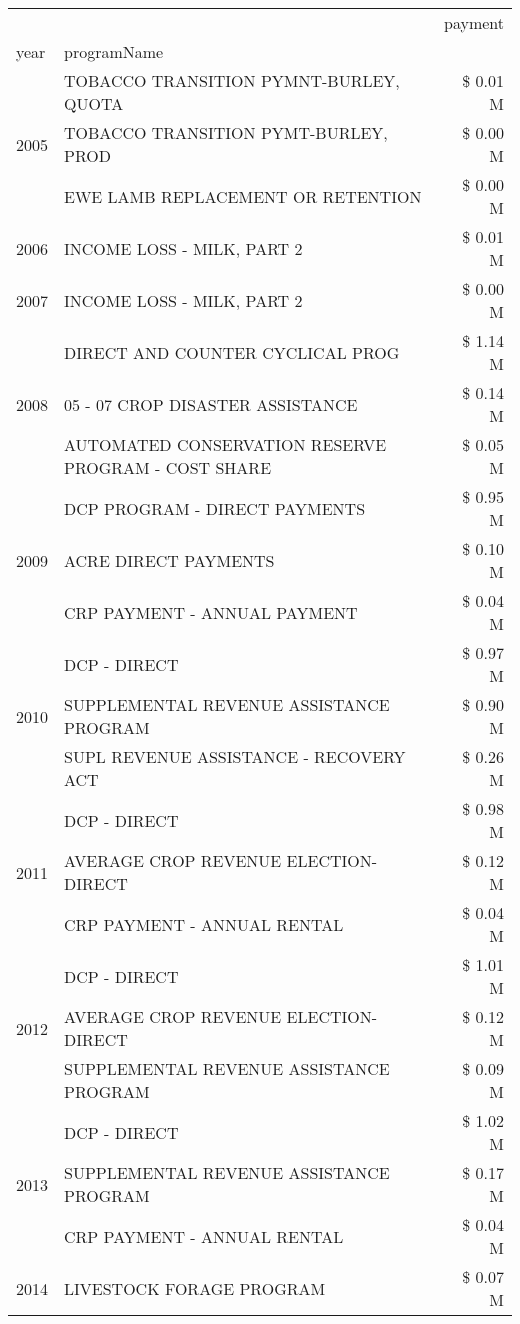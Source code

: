 \begin{tabular}{llr}
\toprule
 &  & payment \\
year & programName &  \\
\midrule
\multirow[t]{3}{*}{2005} & TOBACCO TRANSITION PYMNT-BURLEY, QUOTA & \$ 0.01 M \\
 & TOBACCO TRANSITION PYMT-BURLEY, PROD & \$ 0.00 M \\
 & EWE LAMB REPLACEMENT OR RETENTION & \$ 0.00 M \\
\cline{1-3}
2006 & INCOME LOSS - MILK, PART 2 & \$ 0.01 M \\
\cline{1-3}
2007 & INCOME LOSS - MILK, PART 2 & \$ 0.00 M \\
\cline{1-3}
\multirow[t]{3}{*}{2008} & DIRECT AND COUNTER CYCLICAL PROG & \$ 1.14 M \\
 & 05 - 07 CROP DISASTER ASSISTANCE & \$ 0.14 M \\
 & AUTOMATED CONSERVATION RESERVE PROGRAM - COST SHARE & \$ 0.05 M \\
\cline{1-3}
\multirow[t]{3}{*}{2009} & DCP PROGRAM - DIRECT PAYMENTS & \$ 0.95 M \\
 & ACRE DIRECT PAYMENTS & \$ 0.10 M \\
 & CRP PAYMENT - ANNUAL PAYMENT & \$ 0.04 M \\
\cline{1-3}
\multirow[t]{3}{*}{2010} & DCP - DIRECT & \$ 0.97 M \\
 & SUPPLEMENTAL REVENUE ASSISTANCE PROGRAM & \$ 0.90 M \\
 & SUPL REVENUE ASSISTANCE - RECOVERY ACT & \$ 0.26 M \\
\cline{1-3}
\multirow[t]{3}{*}{2011} & DCP - DIRECT & \$ 0.98 M \\
 & AVERAGE CROP REVENUE ELECTION-DIRECT & \$ 0.12 M \\
 & CRP PAYMENT - ANNUAL RENTAL & \$ 0.04 M \\
\cline{1-3}
\multirow[t]{3}{*}{2012} & DCP - DIRECT & \$ 1.01 M \\
 & AVERAGE CROP REVENUE ELECTION-DIRECT & \$ 0.12 M \\
 & SUPPLEMENTAL REVENUE ASSISTANCE PROGRAM & \$ 0.09 M \\
\cline{1-3}
\multirow[t]{3}{*}{2013} & DCP - DIRECT & \$ 1.02 M \\
 & SUPPLEMENTAL REVENUE ASSISTANCE PROGRAM & \$ 0.17 M \\
 & CRP PAYMENT - ANNUAL RENTAL & \$ 0.04 M \\
\cline{1-3}
\multirow[t]{3}{*}{2014} & LIVESTOCK FORAGE PROGRAM & \$ 0.07 M \\

\end{tabular}
